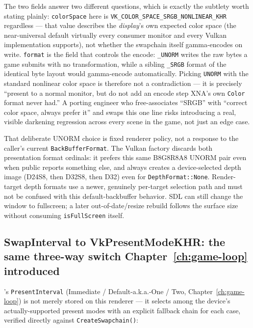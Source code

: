 The two fields answer two different questions, which is exactly the subtlety worth stating
plainly: \texttt{colorSpace} here is \texttt{VK\_COLOR\_SPACE\_SRGB\_NONLINEAR\_KHR} regardless
--- that value describes the \emph{display}'s own expected color space (the near-universal
default virtually every consumer monitor and every Vulkan implementation supports), not
whether the swapchain itself gamma-encodes on write. \texttt{format} is the field that
controls the encode: \texttt{\_UNORM} writes the raw bytes a game submits with no
transformation, while a sibling \texttt{\_SRGB} format of the identical byte layout would
gamma-encode automatically. Picking \texttt{UNORM} with the standard nonlinear color space is
therefore not a contradiction --- it is precisely ``present to a normal monitor, but do not
add an encode step XNA's own \texttt{Color} format never had.'' A porting engineer who
free-associates ``SRGB'' with ``correct color space, always prefer it'' and swaps this one
line risks introducing a real, visible darkening regression across every scene in the game,
not just an edge case.

\begin{sourcenote}
That deliberate UNORM choice is fixed renderer policy, not a response to the caller's current
\texttt{BackBufferFormat}. The Vulkan factory discards both presentation format ordinals:
it prefers this same B8G8R8A8 UNORM pair even when public
 reports something else, and always creates a
device-selected depth image (D24S8, then D32S8, then D32) even for
\texttt{DepthFormat::None}. Render-target depth formats use a newer, genuinely per-target
selection path and must not be confused with this default-backbuffer behavior. SDL can still
change the window to fullscreen; a later out-of-date/resize rebuild follows the surface size
without consuming \texttt{isFullScreen} itself.
\end{sourcenote}

\subsection{SwapInterval to VkPresentModeKHR: the same three-way switch Chapter~\ref{ch:game-loop} introduced}

's \texttt{PresentInterval} (Immediate / Default-a.k.a.-One / Two,
Chapter~\ref{ch:game-loop}) is not merely stored on this renderer --- it selects among the
device's actually-supported present modes with an explicit fallback chain for each case,
verified directly against \texttt{CreateSwapchain()}:


